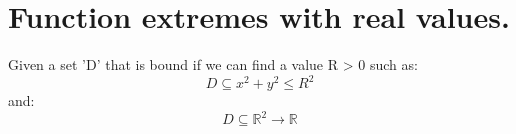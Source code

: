 \documentclass[11pt,fleqn]{book} %
\begin{document}
\section{Function extremes with real values.}

Given a set 'D' that is bound if we can find a value R > 0 such as:
$$ D \subseteq x^2 + y^2 \leq R^2 $$
and:
$$ D \subseteq \mathbb{R}^2 \to \mathbb{R} $$









\end{document}
